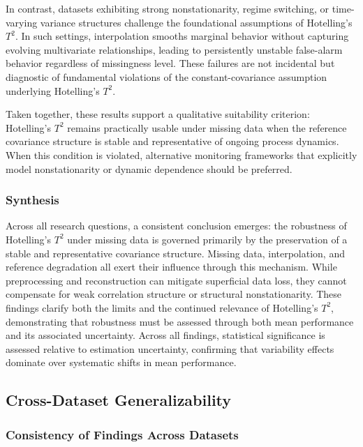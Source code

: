 In contrast, datasets exhibiting strong nonstationarity, regime switching, or time-varying variance structures challenge the foundational assumptions of Hotelling’s $T^2$. In such settings, interpolation smooths marginal behavior without capturing evolving multivariate relationships, leading to persistently unstable false-alarm behavior regardless of missingness level. These failures are not incidental but diagnostic of fundamental violations of the constant-covariance assumption underlying Hotelling’s $T^2$.

Taken together, these results support a qualitative suitability criterion: Hotelling’s $T^2$ remains practically usable under missing data when the reference covariance structure is stable and representative of ongoing process dynamics. When this condition is violated, alternative monitoring frameworks that explicitly model nonstationarity or dynamic dependence should be preferred.

\subsubsection{Synthesis}

Across all research questions, a consistent conclusion emerges: the robustness of Hotelling’s $T^2$ under missing data is governed primarily by the preservation of a stable and representative covariance structure. Missing data, interpolation, and reference degradation all exert their influence through this mechanism. While preprocessing and reconstruction can mitigate superficial data loss, they cannot compensate for weak correlation structure or structural nonstationarity. These findings clarify both the limits and the continued relevance of Hotelling’s $T^2$, demonstrating that robustness must be assessed through both mean performance and its associated uncertainty.
Across all findings, statistical significance is assessed relative to estimation uncertainty, confirming that variability effects dominate over systematic shifts in mean performance.

\subsection{Cross-Dataset Generalizability}

\subsubsection{Consistency of Findings Across Datasets}

